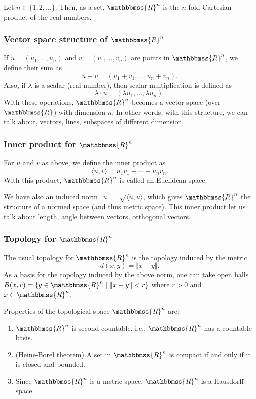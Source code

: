 \documentclass[12pt]{article}
\newcommand{\sR}{\mathbbmss{R}}
\begin{document}
Let $n\in \{1,2,\ldots\}$. Then, as a set, $\sR^n$ is the $n$-fold Cartesian 
product of the real numbers. 

\subsubsection{Vector space structure of $\sR^n$}
If $u=(u_1, \ldots, u_n)$ and 
$v=(v_1, \ldots, v_n)$ are points in $\sR^n$, we define their sum
as
$$ u+v=(u_1+v_1, \ldots, u_n+v_n).$$
Also, if $\lambda$ is a scalar (real number), then scalar multiplication
is defined as 
$$ \lambda \cdot u = (\lambda u_1, \ldots, \lambda u_n).$$
With these operations, $\sR^n$ becomes a vector space (over $\sR$) with dimension $n$.
In other words, with this structure, we can talk about, vectors, lines, subspaces of different dimension. 


\subsubsection{Inner product for $\sR^n$}
For $u$ and $v$ as above, we define the inner product as
$$ \langle u,v \rangle = u_1 v_1 + \cdots + u_n v_n.$$
With this product, $\sR^n$ is called an Euclidean space. 

We have also an induced norm $\left\Vert u \right\Vert =  \sqrt{\langle u,u \rangle}$, which gives
$\sR^n$ the structure of a normed space (and thus metric space).
This inner product let us talk about length, angle between vectors, orthogonal vectors.

\subsubsection{Topology for $\sR^n$}
The usual topology for $\sR^n$ is the topology induced by the metric
$$d(x,y) = \Vert x-y\Vert.$$
As a basis for the topology induced by the above norm, one can take
 open balls $B(x,r)=\{ y\in \sR^n \mid \left\Vert x-y \right\Vert < r\}$ where $r>0$
and $x\in\sR^n$.


Properties of the topological space $\sR^n$ are:
\begin{enumerate}
\item $\sR^n$ is second countable, i.e.,  $\sR^n$ has  a countable basis.
\item (Heine-Borel theorem) 
A set in $\sR^n$ is compact if and only if it is closed and bounded. 
\item Since $\sR^n$ is a metric space, $\sR^n$ is a Hausdorff space. 
\end{enumerate}
\end{document}
